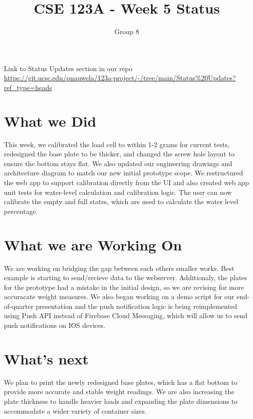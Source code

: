 \documentclass[12pt]{article}
\title{CSE 123A - Week 5 Status}
\author{Group 8}
\date{}
\begin{document}
\pagestyle{fancy}
\maketitle

\fancyfoot{}
\fancyhead{}
\fancyfoot[R]{\thepage}

\noindent Link to Status Updates section in our repo \\
\url{https://git.ucsc.edu/pnauwela/123a-project/-/tree/main/Status%20Updates?ref_type=heads}

\section*{What we Did}
This week, we calibrated the load cell to within 1-2 grams for current tests, redesigned the base plate to be thicker, and changed 
the screw hole layout to ensure the bottom stays flat. We also updated our engineering drawings and architecture diagram 
to match our new initial prototype scope. We restructured the web app to support calibration directly from the UI and also created 
web app unit tests for water-level calculation and calibration logic. The user can now calibrate the empty and full states, which 
are used to calculate the water level percentage. 
 
\section*{What we are Working On}
We are working on bridging the gap between each others smaller works. Best example is starting to send/recieve data to the webserver. Additionaly, the plates
for the prototype had a mistake in the initial design, so we are revising for more accuracate weight measures. We also began working 
on a demo script for our end-of-quarter presentation and the push notification logic is being reimplemented using Push API instead of 
Firebase Cloud Messaging, which will allow us to send push notifications on IOS devices.

\section*{What's next}
We plan to print the newly redesigned base plates, which has a flat bottom to provide more accurate and stable weight 
readings. We are also increasing the plate thickness to handle heavier loads and expanding the plate dimensions to accommodate 
a wider variety of container sizes.
\end{document}
